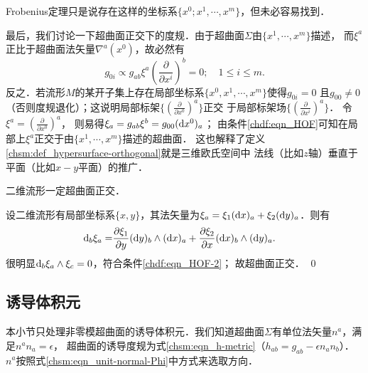 Frobenius定理只是说存在这样的坐标系$\{x^0;x^1,\cdots,x^m\}$，但未必容易找到．

最后，我们讨论一下超曲面正交下的度规．由于超曲面$\Sigma$由$\{x^1,\cdots,x^m\}$描述，
而$\xi^a$正比于超曲面法矢量$\nabla^a(x^0)$，故必然有
\begin{equation}
    g_{0i}\propto g_{ab} \xi^a \left(\frac{\partial }{\partial x^i} \right)^b=0;
    \quad 1\leqslant i \leqslant m .
\end{equation}
反之．若流形$M$的某开子集上存在局部坐标系$\{x^0,x^1,\cdots,x^m\}$使得$g_{0i}=0$
且$g_{00}\neq 0$（否则度规退化）；这说明局部标架$\{(\frac{\partial }{\partial x^0} )^a\}$正交
于局部标架场$\{(\frac{\partial }{\partial x^i} )^a\}$．
令$\xi^a=(\frac{\partial }{\partial x^0} )^a$，
则易得$\xi_a= g_{ab}\xi^b = g_{00}({\rm d}x^0)_a$；
由条件\eqref{chdf:eqn_HOF}可知在局部上$\xi^a$正交于由$\{x^1,\cdots,x^m\}$描述的超曲面．
这也解释了定义\ref{chsm:def_hypersurface-orthogonal}就是三维欧氏空间中
法线（比如$z$轴）垂直于平面（比如$x-y$平面）的推广．

\begin{example}
	二维流形一定超曲面正交．
\end{example}

设二维流形有局部坐标系$\{x,y\}$，其法矢量为$\xi_a=\xi_1 ({\rm d}x)_a+\xi_2 ({\rm d}y)_a$．则有
\begin{align*}
	{\rm d}_b \xi_a = & \frac{\partial \xi_1}{\partial y} ({\rm d}y)_b\wedge ({\rm d}x)_a
	+\frac{\partial \xi_2}{\partial x} ({\rm d}x)_b\wedge ({\rm d}y)_a .
\end{align*}
很明显${\rm d}_b \xi_a \wedge \xi_c =0$，符合条件\eqref{chdf:eqn_HOF-2}；
故超曲面正交． \qed




\subsection{诱导体积元}\label{chsm:sec_induced-VE}
本小节只处理非零模超曲面的诱导体积元．我们知道超曲面$\Sigma$有单位法矢量$n^a$，满足$n^a n_a=\epsilon$，
超曲面的诱导度规为式\eqref{chsm:eqn_h-metric}（$h_{ab} {=} g_{ab} -\epsilon {n}_a {n}_b$）．
$n^a$按照式\eqref{chsm:eqn_unit-normal-Phi}中方式来选取方向．

